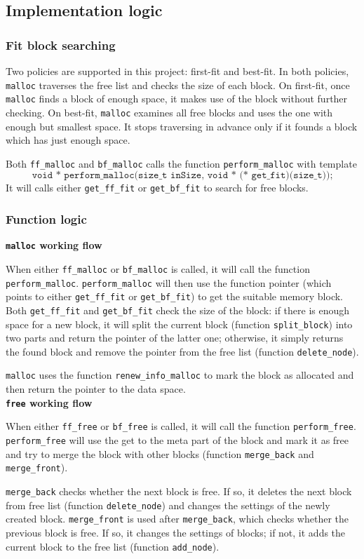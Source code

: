 \documentclass[a4paper,12pt]{article}
\begin{document}
	\subsection{Implementation logic}
	\subsubsection{Fit block searching}
	\par Two policies are supported in this project: first-fit and best-fit. In both policies, \texttt{malloc} traverses the free list and checks the size of each block. On first-fit, once \texttt{malloc} finds a block of enough space, it makes use of the block without further checking. On best-fit, \texttt{malloc} examines all free blocks and uses the one with enough but smallest space. It stops traversing in advance only if it founds a block which has just enough space. 
	\par Both \texttt{ff\_malloc} and \texttt{bf\_malloc} calls the function \texttt{perform\_malloc} with template $$\texttt{void * perform\_malloc(size\_t inSize, void * (* get\_fit)(size\_t));}$$ 
	It will calls either \texttt{get\_ff\_fit} or \texttt{get\_bf\_fit} to search for free blocks. 
	\subsubsection{Function logic}
	\par \textbf{\textbf{\texttt{malloc}} working flow}
	\par When either \texttt{ff\_malloc} or \texttt{bf\_malloc} is called, it will call the function \texttt{perform\_malloc}. \texttt{perform\_malloc} will then use the function pointer (which points to either \texttt{get\_ff\_fit} or \texttt{get\_bf\_fit}) to get the suitable memory block. Both \texttt{get\_ff\_fit} and \texttt{get\_bf\_fit} check the size of the block: if there is enough space for a new block, it will split the current block (function \texttt{split\_block}) into two parts and return the pointer of the latter one; otherwise, it simply returns the found block and remove the pointer from the free list (function \texttt{delete\_node}). 
	\par \texttt{malloc} uses the function \texttt{renew\_info\_malloc} to mark the block as allocated and then return the pointer to the data space. \\
	\textbf{\textbf{\texttt{free}} working flow}
	\par When either \texttt{ff\_free} or \texttt{bf\_free} is called, it will call the function \texttt{perform\_free}. \texttt{perform\_free} will use the get to the meta part of the block and mark it as free and try to merge the block with other blocks (function \texttt{merge\_back} and \texttt{merge\_front}). 
	\par \texttt{merge\_back} checks whether the next block is free. If so, it deletes the next block from free list (function \texttt{delete\_node}) and changes the settings of the newly created block. \texttt{merge\_front} is used after \texttt{merge\_back}, which checks whether the previous block is free. If so, it changes the settings of blocks; if not, it adds the current block to the free list (function \texttt{add\_node}). 
\end{document}
